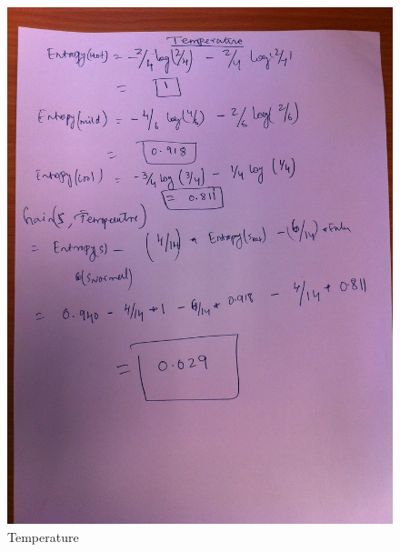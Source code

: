 \documentclass{article}
\begin{document}
\pagebreak
\begin{figure}[hbtp]
\centering
\includegraphics[scale=0.2]{IMG_0733.jpg}
\caption{Temperature}
\end{figure}
\end{document}
